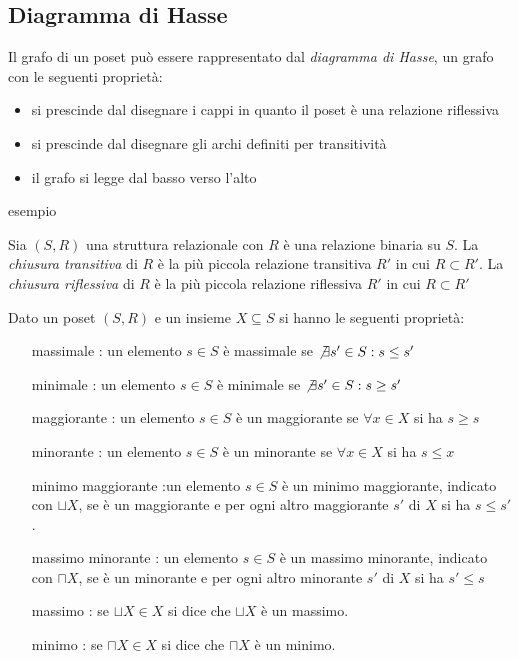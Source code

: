 \subsection{Diagramma di Hasse}
Il grafo di un poset può essere rappresentato dal \emph{diagramma di Hasse}, un grafo
con le seguenti proprietà:
\begin{itemize}
    \item si prescinde dal disegnare i cappi in quanto il poset è una relazione riflessiva
    \item si prescinde dal disegnare gli archi definiti per transitività
    \item il grafo si legge dal basso verso l'alto
\end{itemize}

esempio

Sia $(S,R)$ una struttura relazionale con $R$ è una relazione binaria su $S$.
La \emph{chiusura transitiva} di $R$ è la più piccola relazione transitiva $R'$ in cui $R \subset R'$.
La \emph{chiusura riflessiva} di $R$ è la più piccola relazione riflessiva $R'$ in cui $R \subset R'$

\begin{prop}
Dato un poset $(S,R)$ e un insieme $X \subseteq S$ si hanno le seguenti proprietà:
\begin{enumerate}
    \item[massimale]: un elemento $s \in S$ è massimale se $\not \exists s' \in S : s \leq s'$
    \item[minimale]: un elemento $s \in S$ è minimale se $\not \exists s' \in S : s \geq s'$
    \item[maggiorante]: un elemento $s \in S$ è un maggiorante se $\forall x \in X$ si ha $s \geq s$
    \item[minorante]: un elemento $s \in S$ è un minorante se $\forall x \in X$ si ha $s \leq x$
    \item[minimo maggiorante]:un elemento $s \in S$ è un minimo maggiorante, indicato con $\sqcup X$,
          se è un maggiorante e per ogni altro maggiorante $s'$ di $X$ si ha $s \leq s'$.
    \item[massimo minorante]: un elemento $s \in S$ è un massimo minorante, indicato con $\sqcap X$,
          se è un minorante e per ogni altro minorante $s'$ di $X$ si ha $s' \leq s$
    \item[massimo]: se $\sqcup X \in X$ si dice che $\sqcup X$ è un massimo.
    \item[minimo]: se $\sqcap X \in X$ si dice che $\sqcap X$ è un minimo.
\end{enumerate}
\end{prop}

